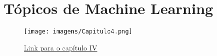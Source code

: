 \documentclass{beamer}
\begin{document}
\section{Tópicos de Machine Learning}

\begin{frame}

    \begin{figure}[ht]
        \centering
        \texttt{[image: imagens/Capitulo4.png]}
        \caption{\href{run:./capitulos/Capitulo4.pdf}{Link para o capítulo IV}}
    \end{figure}

\end{frame}
\end{document}

